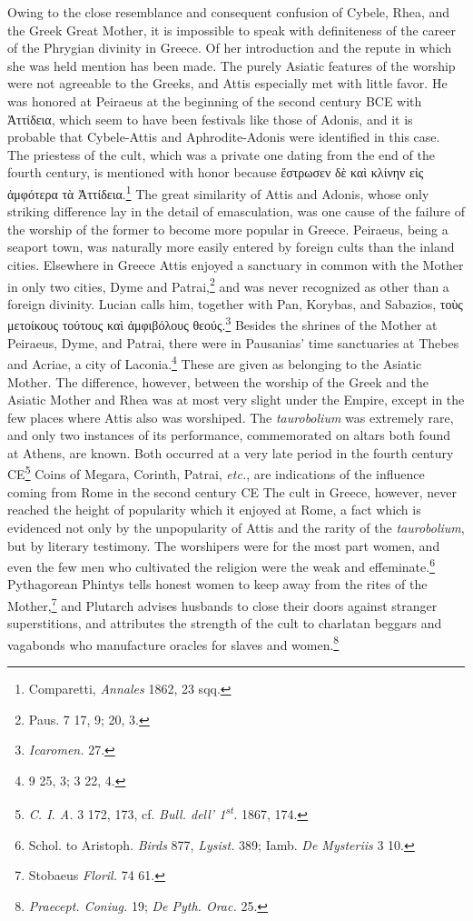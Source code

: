\documentclass[a4paper, 11pt, oneside, polutonikogreek, english]{article}
\begin{document}
Owing to the close resemblance and consequent confusion of Cybele, Rhea, and the Greek Great Mother, it is impossible to speak with definiteness of the career of the Phrygian divinity in Greece. Of her introduction and the repute in which she was held mention has been made. The purely Asiatic features of the worship were not agreeable to the Greeks, and Attis especially met with little favor. He was honored at Peiraeus at the beginning of the second century \textsc{BCE} with Ἀττίδεια, which seem to have been festivals like those of Adonis, and it is probable that Cybele-Attis and Aphrodite-Adonis were identified in this case. The priestess of the cult, which was a private one dating from the end of the fourth century, is mentioned with honor because ἔστρωσεν δὲ καὶ κλίνην εἰς ἀμφότερα τὰ Ἀττίδεια.\footnote{Comparetti, \emph{Annales} 1862, 23 sqq.} The great similarity of Attis and Adonis, whose only striking difference lay in the detail of emasculation, was one cause of the failure of the worship of the former to become more popular in Greece. Peiraeus, being a seaport town, was naturally more easily entered by foreign cults than the inland cities. Elsewhere in Greece Attis enjoyed a sanctuary in common with the Mother in only two cities, Dyme and Patrai,\footnote{Paus. 7 17, 9; 20, 3.} and was never recognized as other than a foreign divinity. Lucian calls him, together with Pan, Korybas, and Sabazios, τοὺς μετοίκους τούτους καὶ ἀμφιβόλους θεούς.\footnote{\emph{Icaromen.} 27.} Besides the shrines of the Mother at Peiraeus, Dyme, and Patrai, there were in Pausanias' time sanctuaries at Thebes and Acriae, a city of Laconia.\footnote{9 25, 3; 3 22, 4.} These are given as belonging to the Asiatic Mother. The difference, however, between the worship of the Greek and the Asiatic Mother and Rhea was at most very slight under the Empire, except in the few places where Attis also was worshiped. The \emph{taurobolium} was extremely rare, and only two instances of its performance, commemorated on altars both found at Athens, are known. Both occurred at a very late period in the fourth century \textsc{CE}\footnote{\emph{C. I. A.} 3 172, 173, cf. \emph{Bull. dell' 1\textsuperscript{st}.} 1867, 174.} Coins of Megara, Corinth, Patrai, \emph{etc.}, are indications of the influence coming from Rome in the second century \textsc{CE} The cult in Greece, however, never reached the height of popularity which it enjoyed at Rome, a fact which is evidenced not only by the unpopularity of Attis and the rarity of the \emph{taurobolium}, but by literary testimony. The worshipers were for the most part women, and even the few men who cultivated the religion were the weak and effeminate.\footnote{Schol. to Aristoph. \emph{Birds} 877, \emph{Lysist.} 389; Iamb. \emph{De Mysteriis} 3 10.} Pythagorean Phintys tells honest women to keep away from the rites of the Mother,\footnote{Stobaeus \emph{Floril.} 74 61.} and Plutarch advises husbands to close their doors against stranger superstitions, and attributes the strength of the cult to charlatan beggars and vagabonds who manufacture oracles for slaves and women.\footnote{\emph{Praecept. Coniug.} 19; \emph{De Pyth. Orac.} 25.}
\end{document}
